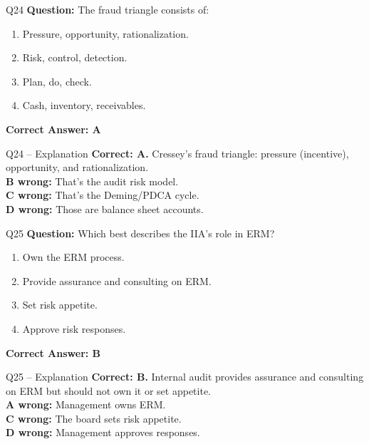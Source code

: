\documentclass[aspectratio=169,10pt]{beamer}
\begin{document}
	\begin{frame}[t]{Q24}
		\small
		\textbf{Question:} The fraud triangle consists of:
		\begin{enumerate}[label=\Alph*.,itemsep=1pt,topsep=2pt]
			\item Pressure, opportunity, rationalization.
			\item Risk, control, detection.
			\item Plan, do, check.
			\item Cash, inventory, receivables.
		\end{enumerate}
		\vspace{4pt}
		\textbf{Correct Answer: A}
	\end{frame}
	
	\begin{frame}[t]{Q24 -- Explanation}
		\small
		\textbf{Correct: A.} Cressey's fraud triangle: pressure (incentive), opportunity, and rationalization. \\[4pt]
		\textbf{B wrong:} That's the audit risk model. \\[2pt]
		\textbf{C wrong:} That's the Deming/PDCA cycle. \\[2pt]
		\textbf{D wrong:} Those are balance sheet accounts.
	\end{frame}
	
	\begin{frame}[t]{Q25}
		\small
		\textbf{Question:} Which best describes the IIA's role in ERM?
		\begin{enumerate}[label=\Alph*.,itemsep=1pt,topsep=2pt]
			\item Own the ERM process.
			\item Provide assurance and consulting on ERM.
			\item Set risk appetite.
			\item Approve risk responses.
		\end{enumerate}
		\vspace{4pt}
		\textbf{Correct Answer: B}
	\end{frame}
	
	\begin{frame}[t]{Q25 -- Explanation}
		\small
		\textbf{Correct: B.} Internal audit provides assurance and consulting on ERM but should not own it or set appetite. \\[4pt]
		\textbf{A wrong:} Management owns ERM. \\[2pt]
		\textbf{C wrong:} The board sets risk appetite. \\[2pt]
		\textbf{D wrong:} Management approves responses.
	\end{frame}
	
\end{document}
